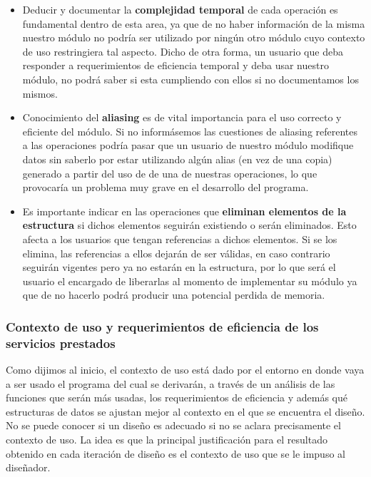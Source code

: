 \begin{itemize}
 \item Deducir y documentar la \textbf{complejidad temporal} de cada operaci\'on es fundamental dentro de esta area, ya que de no haber informaci\'on de la misma nuestro m\'odulo no podr\'ia ser utilizado por ning\'un otro m\'odulo cuyo contexto de uso restringiera tal aspecto. Dicho de otra forma, un usuario que deba responder a requerimientos de eficiencia temporal y deba usar nuestro m\'odulo, no podr\'a saber si esta cumpliendo con ellos si no documentamos los mismos.
 \item Conocimiento del \textbf{aliasing} es de vital importancia para el uso correcto y eficiente del m\'odulo. Si no inform\'asemos las cuestiones de aliasing referentes a las operaciones podr\'ia pasar que un usuario de nuestro m\'odulo modifique datos sin saberlo por estar utilizando alg\'un alias (en vez de una copia) generado a partir del uso de de una de nuestras operaciones, lo que provocar\'ia un problema muy grave en el desarrollo del programa.
 \item Es importante indicar en las operaciones que \textbf{eliminan elementos de la estructura} si dichos elementos seguir\'an existiendo o ser\'an eliminados. Esto afecta a los usuarios que tengan referencias a dichos elementos. Si se los elimina, las referencias a ellos dejar\'an de ser v\'alidas, en caso contrario seguir\'an vigentes pero ya no estar\'an en la estructura, por lo que ser\'a el usuario el encargado de liberarlas al momento de implementar su m\'odulo ya que de no hacerlo podr\'a producir una potencial perdida de memoria.
\end{itemize}

\subsubsection{Contexto de uso y requerimientos de eficiencia de los servicios prestados}

Como dijimos al inicio, el contexto de uso est\'a dado por el entorno en donde vaya a ser usado el programa del cual se derivar\'an, a trav\'es de un an\'alisis de las funciones que ser\'an m\'as usadas, los requerimientos de eficiencia y adem\'as qu\'e estructuras de datos se ajustan mejor al contexto en el que se encuentra el dise\~no. No se puede conocer si un dise\~no es adecuado si no se aclara precisamente el contexto de uso. La idea es que la principal justificaci\'on para el resultado obtenido en cada iteraci\'on de dise\~no es el contexto de uso que se le impuso al dise\~nador.

